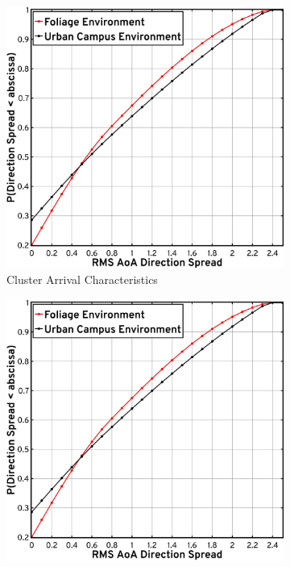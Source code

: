 \documentclass[12pt, draftcls, onecolumn]{IEEEtran}
\begin{document}
{\begin{figure} [t]
    \centering
    \begin{subfigure}{0.495\linewidth}
        \centering
        \includegraphics[width=1.0\linewidth]{figs/rms_direction_spread.pdf}
        \caption{Cluster Arrival Characteristics}
        \label{F12a}
    \end{subfigure}
    \begin{subfigure}{0.495\linewidth}
        \centering
        \includegraphics[width=1.0\linewidth]{figs/rms_direction_spread.pdf}

\end{subfigure}
\end{figure}}
\end{document}
